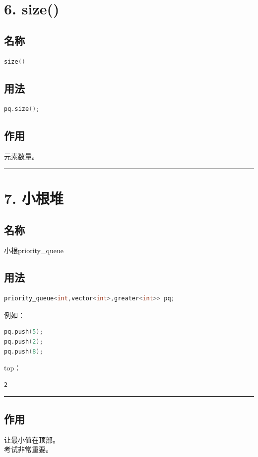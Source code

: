 \documentclass[10pt,twocolumn]{extarticle}
\begin{document}
\section{6. size()}

\subsection{名称}
\begin{lstlisting}[language=C++]
size()
\end{lstlisting}

\subsection{用法}
\begin{lstlisting}[language=C++]
pq.size();
\end{lstlisting}

\subsection{作用}
元素数量。

\noindent\rule{\linewidth}{0.4pt}

\section{7. 小根堆}

\subsection{名称}
小根priority\_queue

\subsection{用法}
\begin{lstlisting}[language=C++]
priority_queue<int,vector<int>,greater<int>> pq;
\end{lstlisting}
例如：
\begin{lstlisting}[language=C++]
pq.push(5);
pq.push(2);
pq.push(8);
\end{lstlisting}
top：
\begin{lstlisting}
2
\end{lstlisting}

\noindent\rule{\linewidth}{0.4pt}

\subsection{作用}
让最小值在顶部。\\
考试非常重要。
\end{document}
